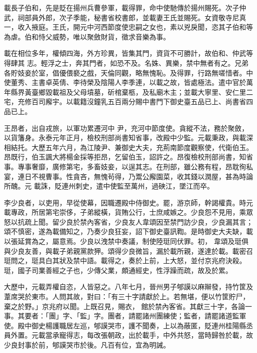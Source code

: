 \begin{pinyinscope}
 載長子伯和，先是貶在揚州兵曹參軍，載得罪，命中使馳傳於揚州賜死。次子仲武，祠部員外郎，次子季能，秘書省校書郎，並載妻王氏並賜死。女資敬寺尼真一，收入掖庭。王氏，開元中河西節度使忠嗣之女也，素以兇戾聞，恣其子伯和等為虐。伯和恃父威勢，唯以聚斂財貨，徵求音樂為事。



 載在相位多年，權傾四海，外方珍異，皆集其門，資貨不可勝計，故伯和、仲武等得肆其
 志。輕浮之士，奔其門者，如恐不及。名姝、異樂，禁中無者有之。兄弟各貯妓妾於室，倡優偎褻之戲，天倫同觀，略無愧恥。及得罪，行路無嗟惜者。中使董秀、主書卓英倩、李待榮及陰陽人李季連，以載之故，皆處極法。遣中官於萬年縣界黃臺鄉毀載祖及父母墳墓，斫棺棄柩，及私廟木主；並載大寧里、安仁里二宅，充修百司廨宇。以載籍沒鐘乳五百兩分賜中書門下御史臺五品已上、尚書省四品已上。



 王昂者，出自戎旅，以軍功累遷河中
 尹，充河中節度使。貪縱不法，務於聚斂，以貨籓身。永泰元年正月，檢校刑部尚書知省事，改殿中少監。元載秉政，與載深相結托。大歷五年六月，為江陵尹、兼御史大夫，充荊南節度觀察使，代衛伯玉。昂既行，伯玉諷大將楊金採等拒昂，乞留伯玉，詔許之。昂復檢校刑部尚書，知省事。專事奢靡，廣修第宅，多畜妓妾，以逞其志。在刑部，雖公務有程，昂耽徇私宴，連日不視曹事。性貪吝，無愧茍得，乃鬻公廨園菜，收其錢以潤屋，甚為時論所醜。元
 載誅，貶連州刺史，遣中使監至萬州，過硤江，墜江而卒。



 李少良者，以吏用，早從使幕，因職遷殿中侍御史。罷，游京師，幹謁權貴。時元載專政，所居第宅崇侈，子弟縱橫，貨賄公行，士庶咸嫉之。少良怨不見用，乘眾怒以抗疏上聞。留少良於禁內客省，少良友人韋頌因至禁門訪少良，少良漏其言；頌不慎密，遂為載備知之，乃奏少良狂妄，詔下御史臺訊鞫。是時御史大夫缺，載以張延賞為之，屬意焉。少良以洩禁中奏議，制使陸珽同伏罪。初，
 韋頌及珽俱與少良友善，與載子弟親黨款狎。頌得少良微旨，漏於載所親，遂達於載。載密召珽問之，珽具白其狀及禁中語。載得之，奏於上前，上大怒，並付京兆府決殺。珽，國子司業善經之子也，少傳父業，頗通經史，性浮躁而疏，故及於累。



 大歷中，元載弄權自恣，人皆惡之。八年七月，晉州男子郇謨以麻辮發，持竹筐及葦席哭於東市。人問其故，對曰：「有三十字請獻於上。若無堪，便以竹筐貯尸，棄之於野。」京兆府以聞。上既召見，賜衣，
 館於禁內客省。其獻三十字，各論一事。其要者：「團」字、「監」字。團者，請罷諸州團練使；監者，請罷諸道監軍使。殿中御史楊護職居左巡，郇謨哭市，護不聞奏，上以為蔽匿，貶連州桂陽縣丞員外置。元載當承寵得志，每改張朝政，出於載手，中外共怒，當時歸咎於載，故少良封事於前，郇謨哭市於後。凡百有位，宜為明誡。




\end{pinyinscope}
